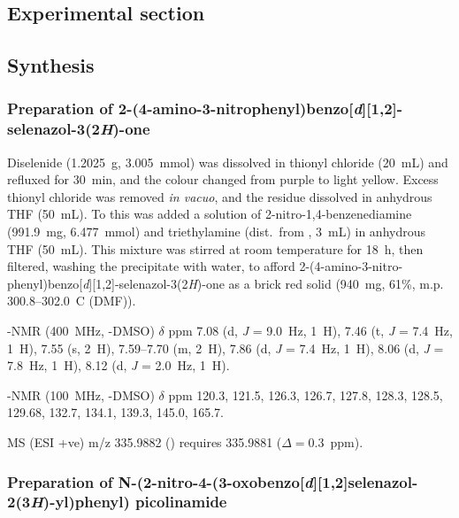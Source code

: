 \begin{refsection}
    \section{Experimental section}
    \subsection{Synthesis}
    \subsubsection[Preparation of \refcmpd{ebs-nitroaniline}]{Preparation of 2-(4-amino-3-nitrophenyl)benzo[\emph{d}][1,2]-selenazol-3(2\emph{H})-one }
    
    Diselenide  (1.2025~g, 3.005~mmol) was dissolved in thionyl chloride (20~mL) and refluxed for 30~min, and the colour changed from purple to light yellow.
    Excess thionyl chloride was removed \emph{in vacuo}, and the residue dissolved in anhydrous THF (50~mL).
    To this was added a solution of 2-nitro-1,4-benzenediamine (991.9~mg, 6.477~mmol) and triethylamine (dist.\ from , 3~mL) in anhydrous THF (50~mL).
    This mixture was stirred at room temperature for 18~h, then filtered, washing the precipitate with water, to afford 2-(4-amino-3-nitro-phenyl)benzo[\emph{d}][1,2]-selenazol-3(2\emph{H})-one  as a brick red solid (940~mg, 61\%, m.p. 300.8--302.0~\degree{}C (DMF)).

    -NMR (400~MHz, -DMSO) $\delta$ ppm
    7.08 (d, \textit{J} = 9.0~Hz, 1~H), 7.46 (t, \textit{J} = 7.4~Hz, 1~H), 7.55 (s, 2~H), 7.59--7.70 (m, 2~H), 7.86 (d, \textit{J} = 7.4~Hz, 1~H), 8.06 (d, \textit{J} = 7.8~Hz, 1~H), 8.12 (d, \textit{J} = 2.0~Hz, 1~H).
    
    -NMR (100~MHz, -DMSO) $\delta$ ppm
    120.3, 121.5, 126.3, 126.7, 127.8, 128.3, 128.5, 129.68, 132.7, 134.1, 139.3, 145.0, 165.7.
    
    MS (ESI +ve) m/z 335.9882 ()  requires 335.9881 ($\Delta=0.3$~ppm).
    
    \subsubsection[Preparation of \refcmpd{ebs-nitroamide-2py}]{Preparation of N-(2-nitro-4-(3-oxobenzo[\emph{d}][1,2]selenazol-2(3\emph{H})-yl)\-phen\-yl) picolinamide }
    

\end{refsection}
